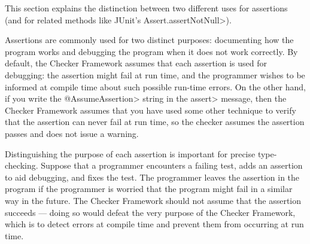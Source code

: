 



This section explains the distinction between two different uses for
assertions (and for related methods like JUnit's \<Assert.assertNotNull>).

Assertions are commonly used for two distinct purposes:  documenting how
the program works and debugging the program when it does not work
correctly.  By default, the Checker Framework assumes that each assertion
is used for debugging:  the assertion might fail at run time, and the programmer
wishes to be informed at compile time about such possible run-time errors.  On
the other hand, if you write the \<@AssumeAssertion> string in the \<assert>
message, then the Checker Framework assumes that you have used some other
technique to verify that the assertion can never fail at run time, so the
checker assumes the assertion passes and does not issue a warning.

Distinguishing the purpose of each assertion is important for precise
type-checking.
Suppose that a
programmer encounters a failing test, adds an assertion to aid debugging, and fixes the
test.  The programmer leaves the assertion in the program if the programmer
is worried that the program might fail in a similar way in the future.
The Checker Framework should not assume that the assertion succeeds ---
doing so would defeat the very purpose of the Checker Framework, which is
to detect errors at compile time and prevent them from occurring at run
time.

